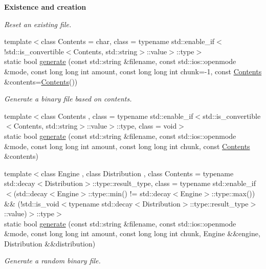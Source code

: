 \begin{Indent}{\bf Existence and creation}
\begin{DoxyCompactItemize}
\begin{DoxyCompactList}\small\item\em Reset an existing file. \end{DoxyCompactList}\item 
{\footnotesize template$<$class Contents  = char, class  = typename std\-::enable\-\_\-if$<$!std\-::is\-\_\-convertible$<$\-Contents, std\-::string$>$\-::value$>$\-::type$>$ }\\static bool \hyperlink{exceptionmagrathea_1_1FileSystem_adb0345d27cbaef759355440effaff913}{generate} (const std\-::string \&filename, const std\-::ios\-::openmode \&mode, const long long int amount, const long long int chunk=-\/1, const \hyperlink{exceptionmagrathea_1_1Contents}{Contents} \&contents=\hyperlink{exceptionmagrathea_1_1Contents}{Contents}())
\begin{DoxyCompactList}\small\item\em Generate a binary file based on contents. \end{DoxyCompactList}\item 
{\footnotesize template$<$class Contents , class  = typename std\-::enable\-\_\-if$<$std\-::is\-\_\-convertible$<$\-Contents, std\-::string$>$\-::value$>$\-::type, class  = void$>$ }\\static bool \hyperlink{exceptionmagrathea_1_1FileSystem_aff977ee70d9313ae9cb9e93ac92cde8d}{generate} (const std\-::string \&filename, const std\-::ios\-::openmode \&mode, const long long int amount, const long long int chunk, const \hyperlink{exceptionmagrathea_1_1Contents}{Contents} \&contents)
\item 
{\footnotesize template$<$class Engine , class Distribution , class Contents  = typename std\-::decay$<$\-Distribution$>$\-::type\-::result\-\_\-type, class  = typename std\-::enable\-\_\-if$<$(std\-::decay$<$\-Engine$>$\-::type\-::min() != std\-::decay$<$\-Engine$>$\-::type\-::max()) \&\& (!std\-::is\-\_\-void$<$typename std\-::decay$<$\-Distribution$>$\-::type\-::result\-\_\-type$>$\-::value)$>$\-::type$>$ }\\static bool \hyperlink{exceptionmagrathea_1_1FileSystem_abc0a5f524e5888a850c94b2404fef886}{generate} (const std\-::string \&filename, const std\-::ios\-::openmode \&mode, const long long int amount, const long long int chunk, Engine \&\&engine, Distribution \&\&distribution)
\begin{DoxyCompactList}\small\item\em Generate a random binary file. \end{DoxyCompactList}\end{DoxyCompactItemize}
\end{Indent}
